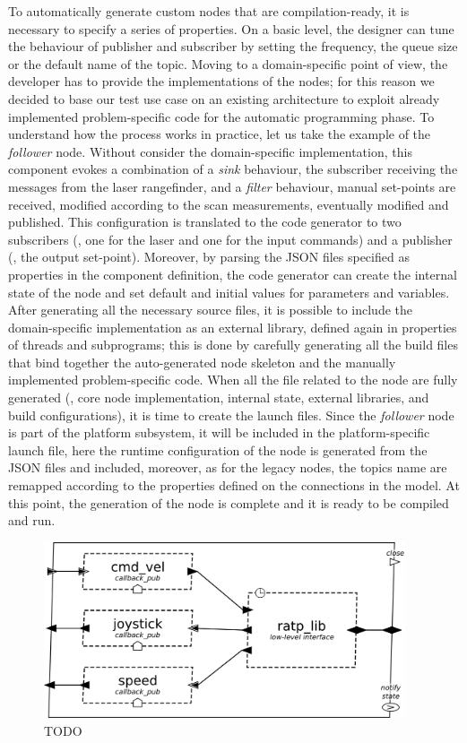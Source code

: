 To automatically generate custom nodes that are compilation-ready, it is necessary to specify a series of properties. On a basic level, the designer can tune the behaviour of publisher and subscriber by setting the frequency, the queue size or the default name of the topic. Moving to a domain-specific point of view, the developer has to provide the implementations of the nodes; for this reason we decided to base our test use case on an existing architecture to exploit already implemented problem-specific code for the automatic programming phase. To understand how the process works in practice, let us take the example of the \textit{follower} node. Without consider the domain-specific implementation, this component evokes a combination of a \textit{sink} behaviour, the subscriber receiving the messages from the laser rangefinder, and a \textit{filter} behaviour, manual set-points are received, modified according to the scan measurements, eventually modified and published. This configuration is translated to the code generator to two subscribers (\ie, one for the laser and one for the input commands) and a publisher (\ie, the output set-point). Moreover, by parsing the JSON files specified as properties in the component definition, the code generator can create the internal state of the node and set default and initial values for parameters and variables. After generating all the necessary source files, it is possible to include the domain-specific implementation as an external library, defined again in properties of threads and subprograms; this is done by carefully generating all the build files that bind together the auto-generated node skeleton and the manually implemented problem-specific code. When all the file related to the node are fully generated (\ie, core node implementation, internal state, external libraries, and build configurations), it is time to create the launch files. Since the \textit{follower} node is part of the platform subsystem, it will be included in the platform-specific launch file, here the runtime configuration of the node is generated from the JSON files and included, moreover, as for the legacy nodes, the topics name are remapped according to the properties defined on the connections in the model. At this point, the generation of the node is complete and it is ready to be compiled and run.

\begin{figure}[t]
\centering
\includegraphics[width=0.95\textwidth]{gfx/pmk/ratp}
\caption{TODO}
\label{fig:pmk-ratp}
\end{figure}

